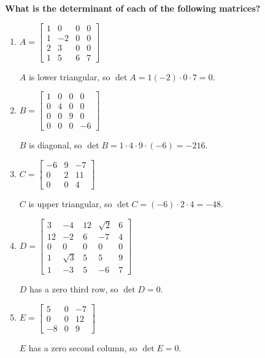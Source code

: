 \providecommand{\rank}{\operatorname{r}}
\providecommand{\RR}{\mathbb R}
\providecommand{\CC}{\mathbb C}
\providecommand{\KK}{\mathbb K}

\setcounter{enumi}{42}
\item {\bfseries\boldmath
What is the determinant of each of the following matrices?
}

\begin{enumerate}[label=\alph*)]

\item $A=\begin{bmatrix}1&0&0&0\\1&-2&0&0\\2&3&0&0\\1&5&6&7\end{bmatrix}$

\begin{answer}
$A$ is lower triangular, so $\det A=1(-2)\cdot0\cdot7=0$.
\end{answer}

\item $B=\begin{bmatrix}1&0&0&0\\0&4&0&0\\0&0&9&0\\0&0&0&-6\end{bmatrix}$

\begin{answer}
$B$ is diagonal, so $\det B=1\cdot4\cdot9\cdot(-6)=-216$.
\end{answer}

\item $C=\begin{bmatrix}-6&9&-7\\0&2&11\\0&0&4\end{bmatrix}$

\begin{answer}
$C$ is upper triangular, so $\det C=(-6)\cdot2\cdot4=-48$.
\end{answer}

\item $D=\begin{bmatrix}3&-4&12&\sqrt2&6\\12&-2&6&-7&4\\0&0&0&0&0\\1&\sqrt3&5&5&9\\1&-3&5&-6&7\end{bmatrix}$

\begin{answer}
$D$ has a zero third row, so $\det D=0$.
\end{answer}

\item $E=\begin{bmatrix}5&0&-7\\0&0&12\\-8&0&9\end{bmatrix}$

\begin{answer}
$E$ has a zero second column, so $\det E=0$.
\end{answer}
\end{enumerate}
